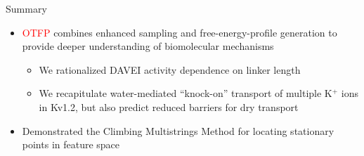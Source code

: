 \documentclass[10pt]{beamer}
\begin{document}
\begin{frame}[fragile]{Summary}
\begin{itemize}
\item \textcolor{red}{OTFP} combines enhanced sampling and free-energy-profile generation to provide deeper understanding of biomolecular mechanisms
\begin{itemize}
\item We rationalized DAVEI activity dependence on linker length
\item We recapitulate water-mediated ``knock-on'' transport of multiple K$^+$ ions in Kv1.2, but also predict reduced barriers for dry transport
\end{itemize}
\item Demonstrated the \textcolor{magenta!80!black}{Climbing Multistrings Method} for locating stationary points in feature space
\end{itemize}
\end{frame}


\end{document}
